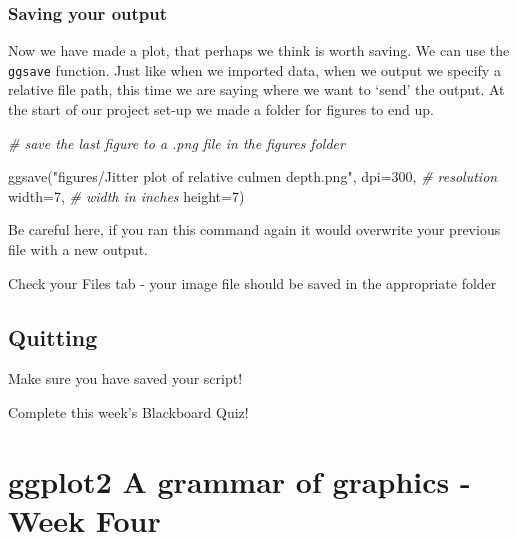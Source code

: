 \documentclass[
]{book}
\makeatletter
\newenvironment{Shaded}{\begin{snugshade}}{\end{snugshade}}
\newcommand{\AttributeTok}[1]{\textcolor[rgb]{0.77,0.63,0.00}{#1}}
\newcommand{\CommentTok}[1]{\textcolor[rgb]{0.56,0.35,0.01}{\textit{#1}}}
\newcommand{\DecValTok}[1]{\textcolor[rgb]{0.00,0.00,0.81}{#1}}
\newcommand{\FunctionTok}[1]{\textcolor[rgb]{0.00,0.00,0.00}{#1}}
\newcommand{\NormalTok}[1]{#1}
\newcommand{\StringTok}[1]{\textcolor[rgb]{0.31,0.60,0.02}{#1}}
\newenvironment{kframe}{%
\medskip{}
\setlength{\fboxsep}{.8em}
 \def\at@end@of@kframe{}%
 \ifinner\ifhmode%
  \def\at@end@of@kframe{\end{minipage}}%
  \begin{minipage}{\columnwidth}%
 \fi\fi%
 \def\FrameCommand##1{\hskip\@totalleftmargin \hskip-\fboxsep
 \colorbox{shadecolor}{##1}\hskip-\fboxsep
     \hskip-\linewidth \hskip-\@totalleftmargin \hskip\columnwidth}%
 \MakeFramed {\advance\hsize-\width
   \@totalleftmargin\z@ \linewidth\hsize
   \@setminipage}}%
 {\par\unskip\endMakeFramed%
 \at@end@of@kframe}
\newenvironment{block}[1]
  {
  \begin{itemize}
  \renewcommand{\labelitemi}{
    \raisebox{-.7\height}[0pt][0pt]{
      {\setkeys{Gin}{width=3em,keepaspectratio}\texttt{[image: images/\#1]}}
    }
  }
  \setlength{\fboxsep}{1em}
  \begin{kframe}
  \item
  }
  {
  \end{kframe}
  \end{itemize}
  }
\newenvironment{rmdquestion}
  {\begin{block}{question}}
  {\end{block}}
\newenvironment{rmdwarning}
  {\begin{block}{warning}}
  {\end{block}}
\makeatother
\begin{document}
\hypertarget{saving-your-output}{%
\subsection{Saving your output}\label{saving-your-output}}

Now we have made a plot, that perhaps we think is worth saving. We can use the \texttt{ggsave} function.
Just like when we imported data, when we output we specify a relative file path, this time we are saying where we want to `send' the output. At the start of our project set-up we made a folder for figures to end up.

\begin{Shaded}
\begin{Highlighting}[]
\CommentTok{\# save the last figure to a .png file in the figures folder}

\FunctionTok{ggsave}\NormalTok{(}\StringTok{"figures/Jitter plot of relative culmen depth.png"}\NormalTok{, }
       \AttributeTok{dpi=}\DecValTok{300}\NormalTok{, }\CommentTok{\# resolution}
       \AttributeTok{width=}\DecValTok{7}\NormalTok{, }\CommentTok{\# width in inches}
       \AttributeTok{height=}\DecValTok{7}\NormalTok{)}
\end{Highlighting}
\end{Shaded}

\begin{rmdwarning}
Be careful here, if you ran this command again it would overwrite your
previous file with a new output.
\end{rmdwarning}

Check your Files tab - your image file should be saved in the appropriate folder

\hypertarget{quitting-2}{%
\section{Quitting}\label{quitting-2}}

\begin{rmdwarning}
Make sure you have saved your script!
\end{rmdwarning}

\begin{rmdquestion}
Complete this week's Blackboard Quiz!
\end{rmdquestion}

\hypertarget{ggplot2-a-grammar-of-graphics---week-four}{%
\chapter{ggplot2 A grammar of graphics - Week Four}\label{ggplot2-a-grammar-of-graphics---week-four}}
\end{document}
